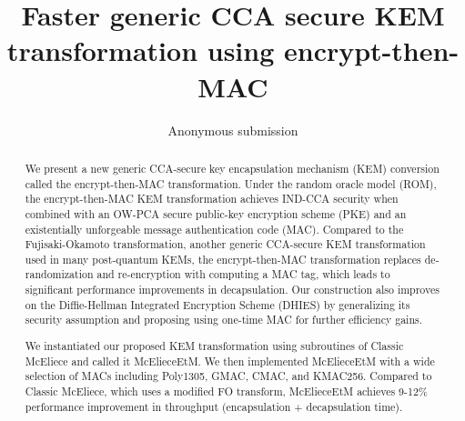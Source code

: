\documentclass[runningheads]{llncs}
\begin{document}
\title{Faster generic CCA secure KEM transformation using encrypt-then-MAC}

\author{
    Anonymous submission
}

\institute{
}

\maketitle              %
%
\begin{abstract}
    We present a new generic CCA-secure key encapsulation mechanism (KEM) conversion called the encrypt-then-MAC transformation. Under the random oracle model (ROM), the encrypt-then-MAC KEM transformation achieves IND-CCA security when combined with an OW-PCA secure public-key encryption scheme (PKE) and an existentially unforgeable message authentication code (MAC). Compared to the Fujisaki-Okamoto transformation, another generic CCA-secure KEM transformation used in many post-quantum KEMs, the encrypt-then-MAC transformation replaces de-randomization and re-encryption with computing a MAC tag, which leads to significant performance improvements in decapsulation. Our construction also improves on the Diffie-Hellman Integrated Encryption Scheme (DHIES) by generalizing its security assumption and proposing using one-time MAC for further efficiency gains.
    
    We instantiated our proposed KEM transformation using subroutines of Classic McEliece and called it McElieceEtM. We then implemented McElieceEtM with a wide selection of MACs including Poly1305, GMAC, CMAC, and KMAC256. Compared to Classic McEliece, which uses a modified FO transform, McElieceEtM achieves 9-12\% performance improvement in throughput (encapsulation + decapsulation time).
\end{abstract}
\end{document}
